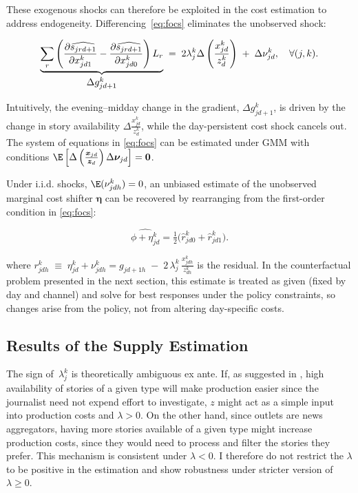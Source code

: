 \documentclass[12pt]{article}
\begin{document}
These exogenous shocks can therefore be exploited in the cost estimation to address endogeneity. Differencing~\eqref{eq:focs} eliminates the unobserved shock:

\begin{equation}\label{eq:diff_foc}
	\underbrace{%
		\sum_{r}\left(
		\frac{\partial \widehat{s_{jrd+1}}}{\partial x_{jd1}^k}
		-
		\frac{\partial \widehat{s_{jrd+1}}}{\partial x_{jd0}^k}
		\right)L_r
	}_{\textstyle \Delta g_{jd+1}^k}
	\;=\;
	2\lambda_j^k
\Delta\left( \frac{x_{jd}^k }{z_{d}^k } \right)
	\;+\;
	\Delta\nu_{jd}^k,
	\quad \forall (j,k).
\end{equation}



 Intuitively, the evening–midday change in the gradient, $\Delta g_{jd+1}^k$, is driven by the change in story availability $\Delta	
\frac{x_{jd}^k }{z_{d}^k }$, while the day-persistent cost shock cancels out. The system of equations in \eqref{eq:focs} can be estimated under GMM with conditions $\E \left[\Delta  \left( \frac{\bm{x}_{jd}}{\bm{z}_{d}} \right)  \Delta\bm\nu_{jd} \right]= \bm{0} $. 



Under i.i.d. shocks, $\E(\nu_{jdh}^k)=0$, an unbiased estimate of the unobserved marginal cost shifter $\bm\eta $ can be recovered by rearranging from the   first-order condition in \eqref{eq:focs}:


\[
\widehat{\phi +\eta_{jd}^k} = \tfrac{1}{2}\big(\hat{r}_{jd0}^k+\hat{r}_{jd1}^k\big).
\]


where  $ r_{jdh}^k \;\equiv\;\eta_{jd}^k+ \nu_{jdh}^k= {{g}_{jd+1h}} \;-\; 2\,{{\lambda}}_j^k\,\frac{x_{jdh}^k}{z_{dh}^k} $ is the residual. In the counterfactual problem presented in the next section, this estimate is treated as given (fixed by day and channel) and solve for best responses under the policy constraints, so changes arise from the policy, not from altering day-specific costs.



\subsection{Results of the Supply Estimation}

 The sign of~$\lambda_j^k$ is theoretically ambiguous ex ante. If, as suggested in \cite{SimonovRao2022}, high availability of stories of a given type will make production easier since the journalist need not expend effort to investigate,  $z$ might act as a simple input into production costs and $ \lambda>0$. On the other hand, since outlets are news aggregators, having more stories available of a given type might increase production costs, since they would need to process and filter the stories they prefer. This mechanism is consistent under $ \lambda<0$. I therefore do not restrict the $\lambda$ to be positive in the estimation and show robustness under stricter version of $\lambda \geq0$.
\end{document}

